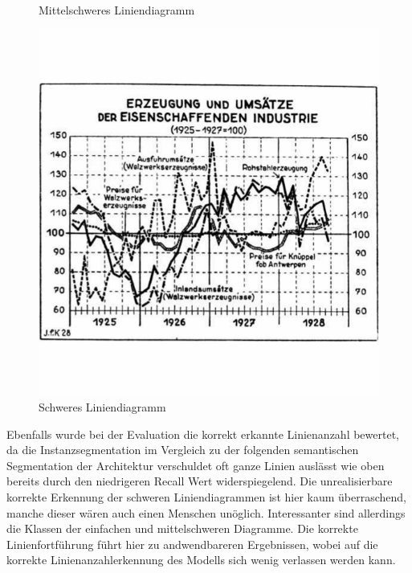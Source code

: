 \begin{figure}[H]
\begin{minipage}{0.315\textwidth}
        \caption{ Mittelschweres Liniendiagramm}
        \label{fig:medium}
    \end{minipage}\hfill %
    \begin{minipage}{0.315\textwidth} %
        \centering
        \includegraphics[width=\linewidth]{Experimente/img/hard.png}
        \caption{ Schweres Liniendiagramm}
        \label{fig:hard}
    \end{minipage}
\end{figure}

Ebenfalls wurde bei der Evaluation die korrekt erkannte Linienanzahl bewertet, da die Instanzsegmentation im Vergleich zu der folgenden semantischen Segmentation der Architektur verschuldet oft ganze Linien auslässt wie oben bereits durch den niedrigeren Recall Wert widerspiegelend.
Die unrealisierbare korrekte Erkennung der schweren Liniendiagrammen ist hier kaum überraschend, manche dieser wären auch einen Menschen unöglich. Interessanter sind allerdings die Klassen der einfachen und mittelschweren Diagramme. Die korrekte Linienfortführung führt hier zu andwendbareren Ergebnissen, wobei auf die korrekte Linienanzahlerkennung des Modells sich wenig verlassen werden kann.

